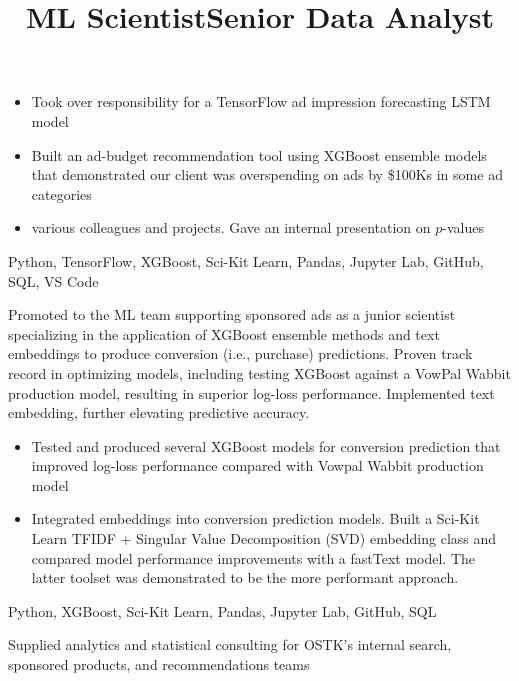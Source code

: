 \documentclass[resmargin, centered, 10pt]{res}
\begin{document}
\begin{resume}
\begin{position}
	\begin{itemize}
		\item {} Took over responsibility for a TensorFlow ad impression forecasting LSTM model
		\item {} Built an ad-budget recommendation tool using XGBoost ensemble models that demonstrated our client was overspending on ads by \$100Ks in some ad categories
		\item {} various colleagues and projects. Gave an internal presentation on $p$-values
	\end{itemize}

	 Python, TensorFlow, XGBoost, Sci-Kit Learn, Pandas, Jupyter Lab, GitHub, SQL, VS Code
\end{position}

\title{ML Scientist}
\begin{position}
	Promoted to the ML team supporting sponsored ads as a junior scientist specializing in the application of XGBoost ensemble methods and text embeddings to produce conversion (i.e., purchase) predictions. Proven track record in optimizing models, including testing XGBoost against a VowPal Wabbit production model, resulting in superior log-loss performance. Implemented text embedding, further elevating predictive accuracy.

	\begin{itemize}
		\item {} Tested and produced several XGBoost models for conversion prediction that improved log-loss performance compared with Vowpal Wabbit production model
		\item {} Integrated embeddings into conversion prediction models. Built a Sci-Kit Learn TFIDF + Singular Value Decomposition (SVD) embedding class and compared model performance improvements with a fastText model. The latter toolset was demonstrated to be the more performant approach.
	\end{itemize}

	 Python, XGBoost, Sci-Kit Learn, Pandas, Jupyter Lab, GitHub, SQL
\end{position}

\title{Senior Data Analyst}
\begin{position}
	\sloppy Supplied analytics and statistical consulting for OSTK's internal search, sponsored products, and recommendations teams \par


\end{position}
\end{resume}
\end{document}

